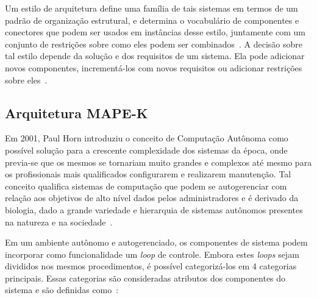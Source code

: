 \documentclass[portugues]{ic-tese}
\begin{document}
Um estilo de arquitetura define uma família de tais sistemas em termos de um padrão de organização estrutural, e determina o vocabulário de componentes e conectores que podem ser usados em instâncias desse estilo, juntamente com um conjunto de restrições sobre como eles podem ser combinados~\citep{Garlan_1993}. A decisão sobre tal estilo depende da solução e dos requisitos de um sistema. Ela pode adicionar novos componentes, incrementá-los com novos requisitos ou adicionar restrições sobre eles~\citep{Bosch_2004}.

\subsection{Arquitetura MAPE-K}

Em 2001, Paul Horn introduziu o conceito de Computação Autônoma como possível solução para a crescente complexidade dos sistemas da época, onde previa-se que os mesmos se tornariam muito grandes e complexos até mesmo para os profissionais mais qualificados configurarem e realizarem manutenção. Tal conceito qualifica sistemas de computação que podem se autogerenciar com relação aos objetivos de alto nível dados pelos administradores e é derivado da biologia, dado a grande variedade e hierarquia de sistemas autônomos presentes na natureza e na sociedade~\citep{Kephart_2003}. 

Em um ambiente autônomo e autogerenciado, os componentes de sistema podem incorporar como funcionalidade um \textit{loop} de controle. Embora estes \textit{loops} sejam divididos nos mesmos procedimentos, é possível categorizá-los em 4 categorias principais. Essas categorias são consideradas atributos dos componentes do sistema e são definidas como~\citep{IBM_2005}:
\end{document}

